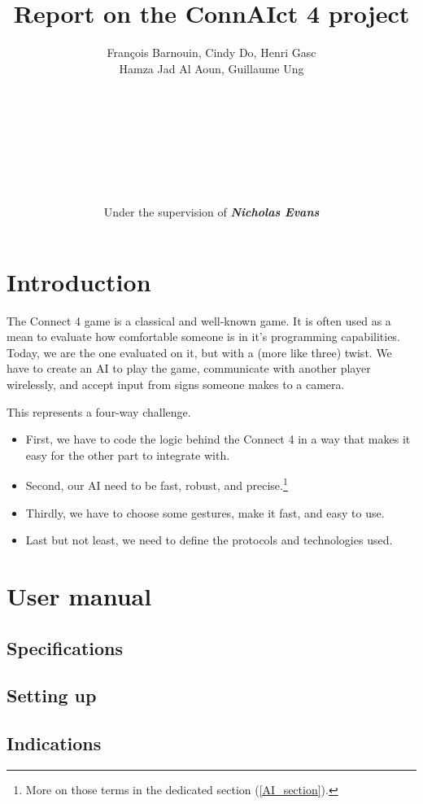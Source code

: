 \documentclass[12pt, a4paper, oneside]{report}
\title{\textbf{Report on the ConnAIct 4 project}}
\author{\normalsize François Barnouin, Cindy Do, Henri Gasc\\\normalsize Hamza Jad Al Aoun, Guillaume Ung\\\\\\\\\\\\\\\\\\Under the supervision of \textbf{\textit{Nicholas Evans}}}
\date{}
\begin{document}
	\maketitle
	\tableofcontents

	\chapter{Introduction}
	The Connect 4 game is a classical and well-known game. It is often used as a mean to evaluate how comfortable someone is in it's programming capabilities. \\
	Today, we are the one evaluated on it, but with a (more like three) twist. We have to create an AI to play the game, communicate with another player wirelessly, and accept input from signs someone makes to a camera.

	This represents a four-way challenge.
	\begin{itemize}
		\item First, we have to code the logic behind the Connect 4 in a way that makes it easy for the other part to integrate with.
		\item Second, our AI need to be fast, robust, and precise.\footnote{More on those terms in the dedicated section (\ref{AI_section}).}
		\item Thirdly, we have to choose some gestures, make it fast, and easy to use.
		\item Last but not least, we need to define the protocols and technologies used.
	\end{itemize}

	\chapter{User manual}

	\section{Specifications}

	\section{Setting up}

	\section{Indications}
\end{document}
